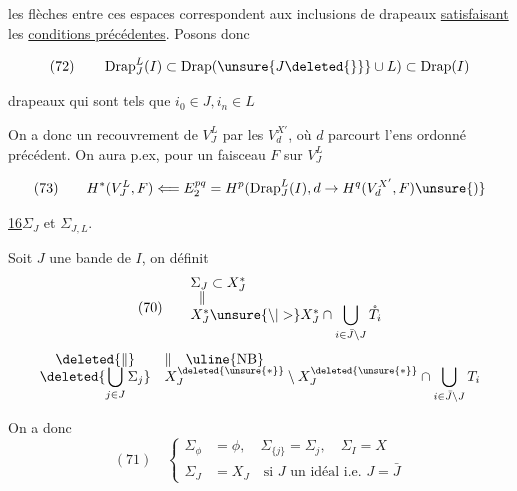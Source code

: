 les flèches entre ces espaces correspondent aux inclusions de drapeaux \uline{satisfaisant} les \uline{conditions précédentes}. Posons donc

\[
(72)\qquad\operatorname{Drap}_J^L(I)\subset\operatorname{Drap}(\unsure{J\deleted{\}}}\cup L)\subset\operatorname{Drap}(I)
\]

drapeaux  qui sont tels que $i_0\in J,i_n\in L$

On a donc un recouvrement de $V_J^L$ par les $V_d^{X'}$, où $d$ parcourt l'ens ordonné précédent. On aura p.ex, pour un faisceau $F$ sur $V_J^L$

\[
(73)\qquad H^*(V_J^L,F)\Longleftarrow E_2^{pq}=H^p(\operatorname{Drap}_J^L(I),d\to H^q(V_d^{X'},F)\unsure{)}
\]



\noindent\uline{16}\quad $\Sigma_J$ et $\Sigma_{J,L}$.


Soit $J$ une bande de $I$, on définit
\[
(70)\qquad
\begin{array}{@{}l@{}}
\Sigma_J\subset X_J^*\\[-.4ex]
\hspace{.6em}\Vert\\[-.4ex]
X_J^*\unsure{\setminus|>}X_J^*\cap\displaystyle\bigcup_{i\in\bar J\setminus J}\mathring T_i
\end{array}
\]
\[
\begin{array}{@{}c@{\quad}l@{}}
\deleted{\Vert}&\Vert\quad\text{\uline{NB}}\\[-.4ex]
\deleted{\displaystyle\bigcup_{j\in J}\Sigma_j}&
X_J^{\deleted{\unsure{*}}}\setminus X_J^{\deleted{\unsure{*}}}\cap\displaystyle\bigcup_{i\in\bar J\setminus J}T_i
\end{array}
\]

On a donc
\[
(71)\quad\left\{
\begin{aligned}
\Sigma_{\phi}&=\phi,\quad\Sigma_{\{j\}}=\Sigma_j,\quad\Sigma_I=X\\
\Sigma_J&=X_J\quad\text{si $J$ un idéal i.e. $J=\bar J$}
\end{aligned}\right.
\]

